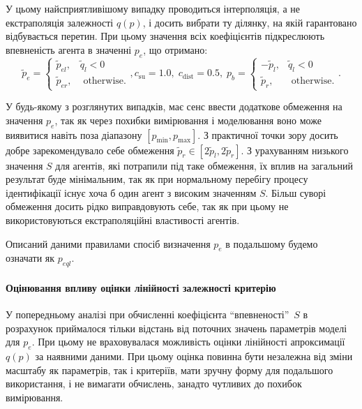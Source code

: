 У цьому найсприятливішому випадку проводиться інтерполяція, а не екстраполяція
залежності $q(p)$, і досить вибрати ту ділянку, на якій гарантовано
відбувається перетин. При цьому значення всіх коефіцієнтів підкреслюють
впевненість агента в значенні $p_e$, що отримано:
%
\begin{equation}
  \tilde{p}_e
  =
  \begin{cases}
    \tilde{p}_{el}, & \tilde{q}_l < 0
    \\
    \tilde{p}_{er}, & \text{ otherwise}.
  \end{cases}
  ,
  c_\mathrm{su} = 1.0, \;  c_\mathrm{dist} = 0.5,  \;
  p_b =
  \begin{cases}
    -\tilde{p}_l, & \tilde{q}_l < 0
    \\
    \tilde{p}_r, & \text{ otherwise}.
  \end{cases}.
  \label{atu:eq:pr_e4}
\end{equation}

У будь-якому з розглянутих випадків, має сенс ввести додаткове обмеження на
значення $p_e$, так як через похибки вимірювання і моделювання воно може
виявитися навіть поза діапазону $[p_{\min}, p_{\max}]$. З практичної
точки зору досить добре зарекомендувало себе обмеження
$\tilde {p}_r \in [2 \tilde{p}_l, 2 \tilde{p}_r]$.
З урахуванням низького значення $S$ для
агентів, які потрапили під таке обмеження, їх вплив на загальний результат буде
мінімальним, так як при нормальному перебігу процесу ідентифікації існує хоча б
один агент з високим значенням $S$. Більш суворі обмеження досить рідко
виправдовують себе, так як при цьому не використовуються екстраполяційні
властивості агентів.

Описаний даними правилами спосіб визначення $p_e$ в подальшому будемо
означати як $p_{eql}$\label{atu:d:p_eql}.

\paragraph{Оцінювання впливу оцінки лінійності залежності критерію}

У попередньому аналізі при обчисленні коефіцієнта
``впевненості''~$S$ в розрахунок приймалося тільки відстань від поточних значень
параметрів моделі для
$p_e$. При цьому не враховувалася можливість оцінки лінійності
апроксимації
$q(p)$ за наявними даними. При цьому оцінка повинна бути незалежна
від зміни масштабу як параметрів, так і критеріїв, мати зручну
форму для подальшого використання, і не вимагати обчислень,
занадто чутливих до похибок вимірювання.

